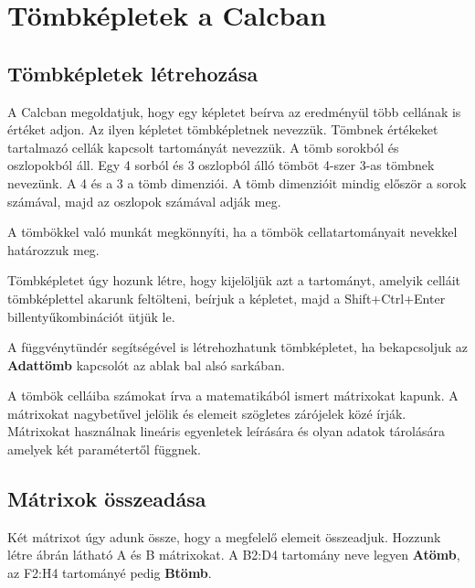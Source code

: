 \chapter{Tömbképletek a Calcban}
\thispagestyle{empty}

\section{Tömbképletek létrehozása}

A Calcban megoldatjuk, hogy egy képletet beírva az eredményül
több cellának is értéket adjon. Az ilyen képletet
tömbképletnek nevezzük. Tömbnek értékeket tartalmazó
cellák kapcsolt tartományát nevezzük. A tömb sorokból és
oszlopokból áll. Egy 4 sorból és 3 oszlopból álló
tömböt 4-szer 3-as tömbnek nevezünk. A 4 és a 3 a tömb
dimenziói. A tömb dimenzióit mindig először a sorok
számával, majd az oszlopok számával adják meg.

A tömbökkel való munkát megkönnyíti, ha a tömbök
cellatartományait nevekkel határozzuk meg.

Tömbképletet úgy hozunk létre, hogy kijelöljük azt a
tartományt, amelyik celláit tömbképlettel akarunk feltölteni,
beírjuk a képletet, majd a Shift+Ctrl+Enter
billentyűkombinációt ütjük le.

A függvénytündér segítségével is létrehozhatunk
tömbképletet, ha bekapcsoljuk az \textbf{Adattömb} kapcsolót az
ablak bal alsó sarkában. 

A tömbök celláiba számokat írva a matematikából ismert
mátrixokat kapunk. A mátrixokat nagybetűvel jelölik és
elemeit szögletes zárójelek közé írják. Mátrixokat
használnak lineáris egyenletek leírására és olyan adatok
tárolására amelyek két paramétertől függnek.


\section{Mátrixok összeadása}

Két mátrixot úgy adunk össze, hogy a megfelelő elemeit
összeadjuk. Hozzunk létre  ábrán látható
A és B mátrixokat. A B2:D4 tartomány neve legyen \textbf{Atömb}, az
F2:H4 tartományé pedig \textbf{Btömb}.

